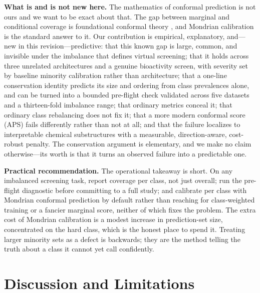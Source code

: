 \documentclass[11pt]{article}
\begin{document}
\textbf{What is and is not new here.} The mathematics of conformal prediction is not ours and we
want to be exact about that. The gap between marginal and conditional coverage is foundational
conformal theory \cite{vovk2013,angelopoulos2023}, and Mondrian calibration is the standard answer
to it. Our contribution is empirical, explanatory, and---new in this revision---predictive: that
this known gap is large, common, and invisible under the imbalance that defines virtual screening;
that it holds across three unrelated architectures and a genuine bioactivity screen, with severity
set by baseline minority calibration rather than architecture; that a one-line conservation
identity predicts its size and ordering from class prevalences alone, and can be turned into a
bounded pre-flight check validated across five datasets and a thirteen-fold imbalance range; that
ordinary metrics conceal it; that ordinary class rebalancing does not fix it; that a more modern
conformal score (APS) fails differently rather than not at all; and that the failure localizes to
interpretable chemical substructures with a measurable, direction-aware, cost-robust penalty. The
conservation argument is elementary, and we make no claim otherwise---its worth is that it turns an
observed failure into a predictable one.

\textbf{Practical recommendation.} The operational takeaway is short. On any imbalanced screening
task, report coverage per class, not just overall; run the pre-flight diagnostic before committing
to a full study; and calibrate per class with Mondrian conformal prediction by default rather than
reaching for class-weighted training or a fancier marginal score, neither of which fixes the
problem. The extra cost of Mondrian calibration is a modest increase in prediction-set size,
concentrated on the hard class, which is the honest place to spend it. Treating larger minority
sets as a defect is backwards; they are the method telling the truth about a class it cannot yet
call confidently.

\section{Discussion and Limitations}
\end{document}
